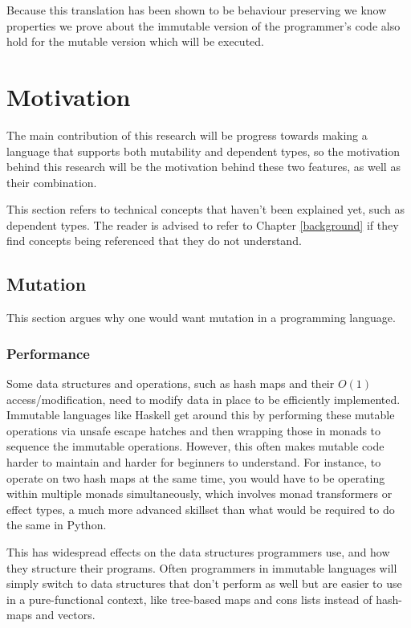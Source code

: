 \documentclass[12pt,twoside]{report}
\begin{document}
Because this translation has been shown to be behaviour preserving\citep{ullrich_electrolysis_nodate} we know properties we prove about the immutable version of the programmer's code also hold for the mutable version which will be executed.

\section{Motivation}
The main contribution of this research will be progress towards making a language that supports both mutability and dependent types, so the motivation behind this research will be the motivation behind these two features, as well as their combination.

This section refers to technical concepts that haven't been explained yet, such as dependent types. The reader is advised to refer to Chapter \ref*{background} if they find concepts being referenced that they do not understand.

\subsection{Mutation}
This section argues why one would want mutation in a programming language.

\subsubsection{Performance}
Some data structures and operations, such as hash maps and their $O(1)$ access/modification, need to modify data in place to be efficiently implemented. Immutable languages like Haskell get around this by performing these mutable operations via unsafe escape hatches and then wrapping those in monads to sequence the immutable operations. However, this often makes mutable code harder to maintain and harder for beginners to understand. For instance, to operate on two hash maps at the same time, you would have to be operating within multiple monads simultaneously, which involves monad transformers or effect types, a much more advanced skillset than what would be required to do the same in Python.

This has widespread effects on the data structures programmers use, and how they structure their programs. Often programmers in immutable languages will simply switch to data structures that don't perform as well but are easier to use in a pure-functional context, like tree-based maps and cons lists instead of hash-maps and vectors.
\end{document}

